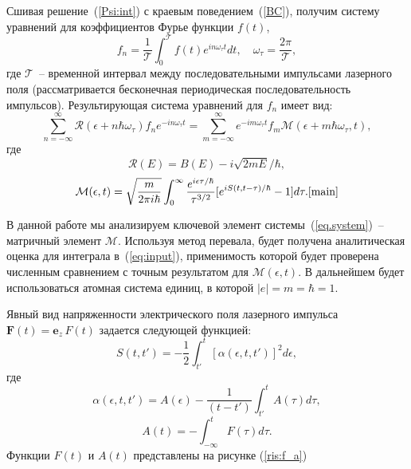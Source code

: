 \documentclass[14pt, a4paper]{article}
\numberwithin{figure}{section}
\numberwithin{equation}{section}
\newcommand{\vF}{\mathbf{F}}
\newcommand{\ve}{\mathbf{e}}
\newcommand{\cR}{\mathcal{R}}
\newcommand{\cM}{\mathcal{M}}
\newcommand{\cT}{\mathcal{T}}
\begin{document}
Сшивая решение~(\ref{Psi:int}) с краевым поведением~(\ref{BC}), получим систему уравнений для коэффициентов Фурье функции $f(t)$, 
\begin{equation}
\label{forier:f}
f_n=\frac{1}{\cT}\int_0^{\cT} f(t) e^{in\omega_\tau t}dt,\quad \omega_\tau = \frac{2\pi}{\cT}, 
\end{equation}
где $\cT$~-- временной интервал между последовательными импульсами лазерного поля (рассматривается бесконечная периодическая последовательность импульсов).\cite{12}
Результирующая система уравнений для $f_n$ имеет вид:
\begin{equation}
\label{eq.system}
\sum_{n=-\infty}^\infty \cR(\epsilon+n\hbar\omega_\tau)f_ne^{-in\omega_\tau t} = \sum_{m=-\infty}^\infty e^{-im\omega_\tau t} f_m \cM(\epsilon+m\hbar\omega_\tau,t),
\end{equation}
где
\begin{equation}
\label{R}
\cR(E) = B(E) - i\sqrt{2mE}/\hbar,
\end{equation}
\begin{equation}
\label{eq:input}
\cM(\epsilon,t) = \sqrt{\frac{m}{2\pi i\hbar}}\int_0^{\infty}
\frac{e^{i\epsilon\tau/\hbar}}{\tau^{3/2}}[e^{iS(t,t-\tau)/\hbar}-1]d\tau. \cite{main}
\end{equation}

В данной работе мы анализируем ключевой элемент системы~(\ref{eq.system})~-- матричный элемент $\cM$. Используя метод перевала, будет получена аналитическая оценка для интеграла в~(\ref{eq:input}), применимость которой будет проверена численным сравнением с точным результатом для $\cM(\epsilon,t)$. В дальнейшем будет использоваться атомная система единиц, в которой $|e|=m=\hbar=1$.

Явный вид напряженности электрического поля лазерного импульса $\vF (t) = \ve_z\,F(t)$ задается следующей функцией:
\begin{equation}\label{eq:s}
S(t, t') = -\frac{1}{2}\int_{t'}^{t} [\alpha(\epsilon, t, t')]^2 d\epsilon,
\end{equation}
где
\begin{equation}\label{eq:alpha}
\alpha(\epsilon, t, t') = A(\epsilon) - \frac{1}{(t-t')}\int_{t'}^{t}A(\tau) d\tau,
\end{equation}
\begin{equation}\label{eq:a}
A(t) = -\int_{-\infty}^{t} F(\tau) d\tau.
\end{equation}
Функции $F(t)$ и $A(t)$ представлены на рисунке (\ref{ris:f_a})
\end{document}
